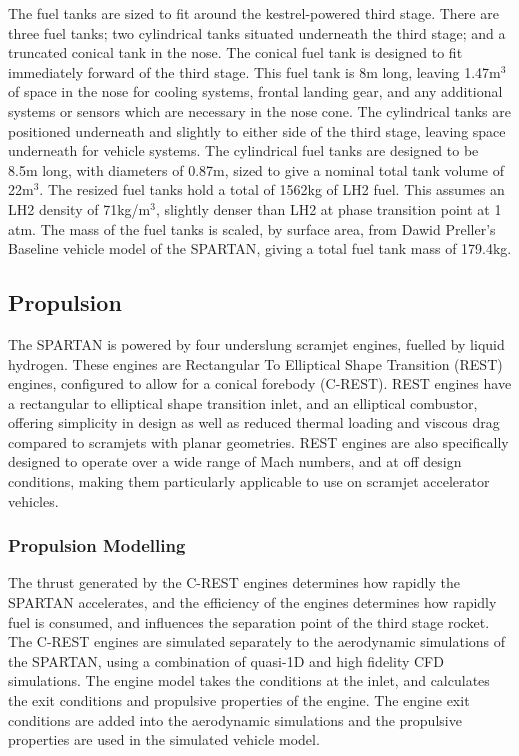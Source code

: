 		The fuel tanks are sized to fit around the kestrel-powered third stage. There are three fuel tanks; two cylindrical tanks situated underneath the third stage; and a truncated conical tank in the nose. The conical fuel tank is designed to fit immediately forward of the third stage. This fuel tank is 8m long, leaving 1.47m$^3$ of space in the nose for cooling systems, frontal landing gear, and any additional systems or sensors which are necessary in the nose cone. The cylindrical tanks are positioned underneath and slightly to either side of the third stage, leaving space underneath for vehicle systems. The cylindrical fuel tanks are designed to be 8.5m long, with diameters of 0.87m, sized to give a nominal total tank volume of 22m$^3$.
The resized fuel tanks hold a total of 1562kg of LH2 fuel. This assumes an LH2 density of 71kg/m$^3$, slightly denser than LH2 at phase transition point at 1 atm.
The mass of the fuel tanks is scaled, by surface area, from Dawid Preller's Baseline vehicle model of the SPARTAN\cite{Preller2017b}, giving a total fuel tank mass of 179.4kg.
		
		


\subsection{Propulsion}\label{sec:propulsion}


The SPARTAN is powered by four underslung scramjet engines, fuelled by liquid hydrogen. These engines are Rectangular To Elliptical Shape Transition (REST) engines, configured to allow for a conical forebody (C-REST). REST engines have a rectangular to elliptical shape transition inlet, and an elliptical combustor, offering simplicity in design as well as reduced thermal loading and viscous drag compared to scramjets with planar geometries\cite{Suraweera2009}.  REST engines are also specifically designed to operate over a wide range of Mach numbers, and at off design conditions, making them particularly applicable to use on scramjet accelerator vehicles. 


\subsubsection{Propulsion Modelling}\label{sec:Propulsion}

 The thrust generated by the C-REST engines determines how rapidly the SPARTAN accelerates, and the efficiency of the engines determines how rapidly fuel is consumed, and influences the separation point of the third stage rocket. The C-REST engines are simulated separately to the aerodynamic simulations of the SPARTAN, using a combination of quasi-1D and high fidelity CFD simulations\cite{Preller2017b,Preller2018a}. The engine model takes the conditions at the inlet, and calculates the exit conditions and propulsive properties of the engine. The engine exit conditions are added into the aerodynamic simulations and the propulsive properties are used in the simulated vehicle model.

